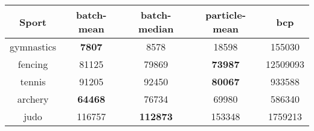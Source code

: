 \begin{tabular}{|c|c|c|c|c|}
\hline
Sport & batch-mean & batch-median & particle-mean & bcp \\
\hline
gymnastics & \textbf{7807} & 8578 & 18598 & 155030 \\
fencing & 81125 & 79869 & \textbf{73987} & 12509093 \\
tennis & 91205 & 92450 & \textbf{80067} & 933588 \\
archery & \textbf{64468} & 76734 & 69980 & 586340 \\
judo & 116757 & \textbf{112873} & 153348 & 1759213 \\
\hline
\end{tabular}
